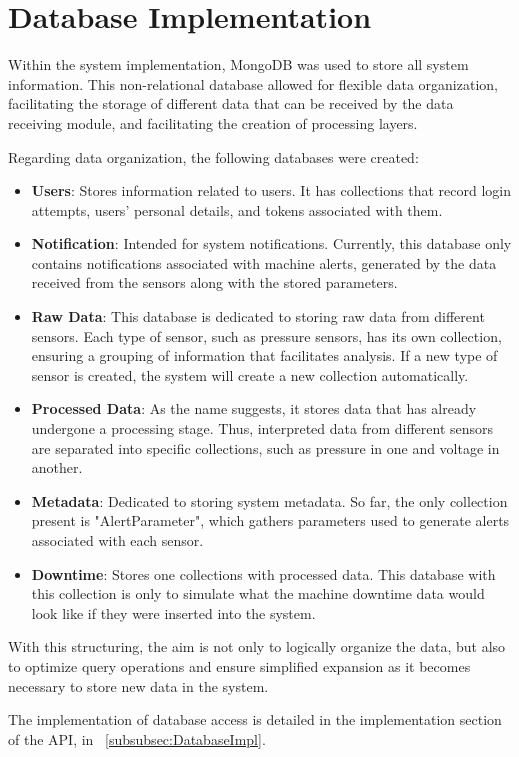 \section[Database Implementation]{Database Implementation}

Within the system implementation, MongoDB was used to store all system information. This non-relational database allowed for flexible data organization, facilitating the storage of different data that can be received by the data receiving module, and facilitating the creation of processing layers.

Regarding data organization, the following databases were created:

\begin{itemize}
    \item \textbf{Users}: Stores information related to users. It has collections that record login attempts, users' personal details, and tokens associated with them.
    
    \item \textbf{Notification}: Intended for system notifications. Currently, this database only contains notifications associated with machine alerts, generated by the data received from the sensors along with the stored parameters.
    
    \item \textbf{Raw Data}: This database is dedicated to storing raw data from different sensors. Each type of sensor, such as pressure sensors, has its own collection, ensuring a grouping of information that facilitates analysis. If a new type of sensor is created, the system will create a new collection automatically.
    
    \item \textbf{Processed Data}: As the name suggests, it stores data that has already undergone a processing stage. Thus, interpreted data from different sensors are separated into specific collections, such as pressure in one and voltage in another.
    
    \item \textbf{Metadata}: Dedicated to storing system metadata. So far, the only collection present is "AlertParameter", which gathers parameters used to generate alerts associated with each sensor.
    
    \item \textbf{Downtime}: Stores one collections with processed data. This database with this collection is only to simulate what the machine downtime data would look like if they were inserted into the system.
\end{itemize}

With this structuring, the aim is not only to logically organize the data, but also to optimize query operations and ensure simplified expansion as it becomes necessary to store new data in the system.

The implementation of database access is detailed in the implementation section of the \gls{API}, in ~\ref{subsubsec:DatabaseImpl}.